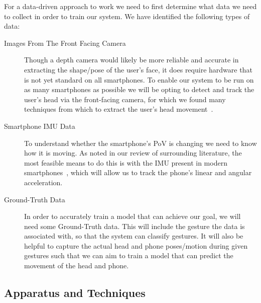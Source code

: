 For a data-driven approach to work we need to first determine what data we need to collect in order to train our system. We have identified the following types of data:
\begin{description}
    \item[Images From The Front Facing Camera]\nl 
    Though a depth camera would likely be more reliable and accurate in extracting the shape/pose of the user's face, it does require hardware that is not yet standard on all smartphones. To enable our system to be run on as many smartphones as possible we will be opting to detect and track the user's head via the front-facing camera, for which we found many techniques from which to extract the user's head movement~\cite{varona2008hands, lopez2012head, viola2004robust, kim2017real, neto2012real, francone2011using, yan2021fast}.
    \item[Smartphone IMU Data]\nl 
        To understand whether the smartphone's PoV is changing we need to know how it is moving. 
        As noted in our review of surrounding literature, the most feasible means to do this is with the IMU present in modern smartphones~\cite{mantyla2000hand, kratz2013combining, neelasagar2015real, garcia2014contextualized}, which will allow us to track the phone's linear and angular acceleration.
    \item[Ground-Truth Data]\nl 
        In order to accurately train a model that can achieve our goal, we will need some Ground-Truth data. This will include the gesture the data is associated with, so that the system can classify gestures. It will also be helpful to capture the actual head and phone poses/motion during given gestures such that we can aim to train a model that can predict the movement of the head and phone.
\end{description}

\subsection{Apparatus and Techniques}

